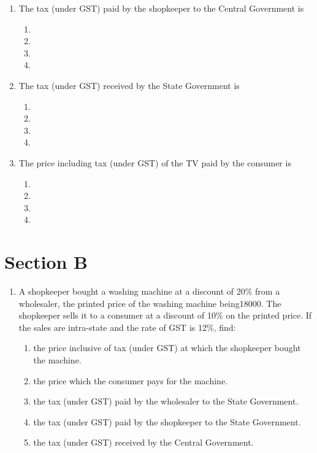 \documentclass[12pt]{article}
\begin{document}
\begin{multicols}{2}
\begin{enumerate}[label=\textbf{\arabic*.},resume]
\item The tax (under GST) paid by the shopkeeper to the Central Government is
\begin{enumerate}[label=(\alph*)]
\item {}
\item {}
\item {}
\item {}
\end{enumerate}

\item The tax (under GST) received by the State Government is
\begin{enumerate}[label=(\alph*)]
\item {}
\item {}
\item {}
\item {}
\end{enumerate}

\item The price including tax (under GST) of the TV paid by the consumer is
\begin{enumerate}[label=(\alph*)]
\item {}
\item {}
\item {}
\item {}
\end{enumerate}
\end{enumerate}

\section*{Section B}
\begin{enumerate}[label=\textbf{\arabic*.}]
\item A shopkeeper bought a washing machine at a discount of 20\% from a wholesaler, 
the printed price of the washing machine being18000. The shopkeeper sells it to a 
consumer at a discount of 10\% on the printed price. If the sales are intra-state and 
the rate of GST is 12\%, find:
\begin{enumerate}[label=(\roman*)]
\item the price inclusive of tax (under GST) at which the shopkeeper bought the machine.
\item the price which the consumer pays for the machine.
\item the tax (under GST) paid by the wholesaler to the State Government.
\item the tax (under GST) paid by the shopkeeper to the State Government.
\item the tax (under GST) received by the Central Government.
\end{enumerate}


\end{enumerate}
\end{multicols}
\end{document}
